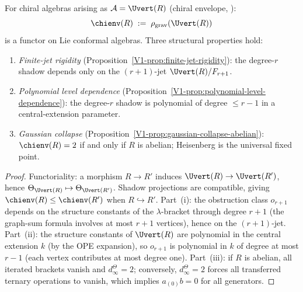 \begin{proposition}
\ClaimStatusProvedHere
{}
For chiral algebras arising as $\cA = \Uvert(R)$
\textup{(}chiral envelope, \cite[\S3.7]{BD04}\textup{)}:
\begin{equation}%
\chienv(R)
\;:=\;
\rho_{\mathrm{grav}}(\Uvert(R))
\end{equation}
is a functor on Lie conformal algebras. Three structural
properties hold:
\begin{enumerate}[label=\textup{(\roman*)}]
\item \emph{Finite-jet rigidity}
 \textup{(}Proposition~\ref{V1-prop:finite-jet-rigidity}\textup{)}:
 the degree-$r$ shadow depends only on the $(r{+}1)$-jet
 $\Uvert(R)/F_{r+1}$.
\item \emph{Polynomial level dependence}
 \textup{(}Proposition~\ref{V1-prop:polynomial-level-dependence}\textup{)}:
 the degree-$r$ shadow is polynomial of degree $\leq r{-}1$ in
 a central-extension parameter.
\item \emph{Gaussian collapse}
 \textup{(}Proposition~\ref{V1-prop:gaussian-collapse-abelian}\textup{)}:
 $\chienv(R) = 2$ if and only if $R$ is abelian; Heisenberg is
 the universal fixed point.
\end{enumerate}
\end{proposition}

\begin{proof}
Functoriality: a morphism $R \to R'$ induces
$\Uvert(R) \to \Uvert(R')$, hence
$\Theta_{\Uvert(R)} \mapsto \Theta_{\Uvert(R')}$.
Shadow projections are compatible, giving
$\chienv(R) \leq \chienv(R')$ when $R \hookrightarrow R'$.
Part~(i): the obstruction class $o_{r+1}$ depends on
the structure constants of the $\lambda$-bracket through
degree $r+1$ (the graph-sum formula involves at most $r+1$
vertices), hence on the $(r{+}1)$-jet.
Part~(ii): the structure constants of $\Uvert(R)$ are polynomial
in the central extension $k$ (by the OPE expansion), so
$o_{r+1}$ is polynomial in $k$ of degree at most $r-1$
(each vertex contributes at most degree one).
Part~(iii): if $R$ is abelian, all iterated brackets vanish
and \(d^\Theta_\infty=2\); conversely, \(d^\Theta_\infty=2\) forces
all transferred ternary operations to vanish, which implies
$a_{(0)}b = 0$ for all generators.
\end{proof}

